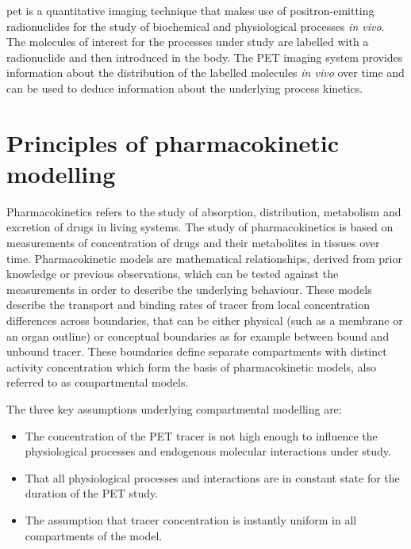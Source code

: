 \Gls{pet} is a quantitative imaging technique that makes use of 
positron-emitting radionuclides for the study of biochemical and physiological processes \textit{in vivo}. The molecules of interest for the processes under study are labelled with a radionuclide and then introduced in the body. The PET imaging system provides information about the distribution of the labelled molecules \textit{in vivo} over time and can be used to deduce information about the underlying process kinetics. 

\section{Principles of pharmacokinetic modelling}
Pharmacokinetics refers to the study of absorption, distribution, metabolism and excretion of drugs in living systems. The study of pharmacokinetics is based on measurements of concentration of drugs and their metabolites in tissues over time. Pharmacokinetic models are mathematical relationships, derived from prior knowledge or previous observations, which can be tested against the measurements in order to describe the underlying behaviour. These models describe the transport and binding rates of tracer from local concentration differences across boundaries, that can be either physical (such as a membrane or an organ outline) or conceptual boundaries as for example between bound and unbound tracer. These boundaries define separate compartments with distinct activity concentration which form the basis of pharmacokinetic models, also referred to as compartmental models.

The three key assumptions underlying compartmental modelling are:
\begin{itemize}
\item The concentration of the PET tracer is not high enough to influence the physiological processes and endogenous molecular interactions under study.
\item That all physiological processes and interactions are in constant state for the duration of the PET study.
\item The assumption that tracer concentration is instantly uniform in all compartments of the model.
\end{itemize}

